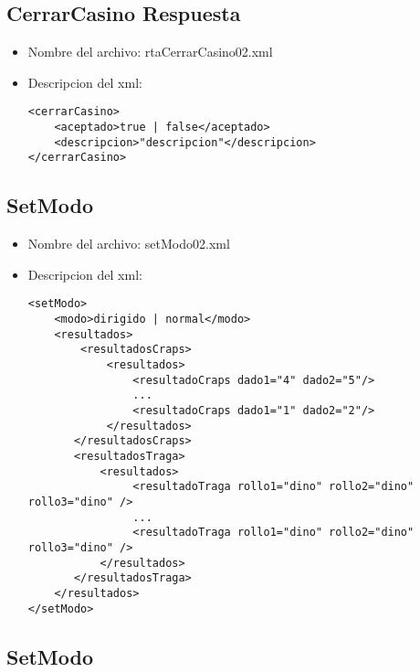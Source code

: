 \subsection{CerrarCasino Respuesta}
\label{sec:CerrarCasinoRespuesta}

\begin{itemize}
	\item Nombre del archivo: rtaCerrarCasino02.xml
	\item Descripcion del xml:
		\begin{verbatim}
<cerrarCasino>
    <aceptado>true | false</aceptado>			
    <descripcion>"descripcion"</descripcion>
</cerrarCasino>
		\end{verbatim}
\end{itemize}

\subsection{SetModo}
\label{sec:SetModo}

\begin{itemize}
	\item Nombre del archivo: setModo02.xml
	\item Descripcion del xml:
		\begin{verbatim}
<setModo>
    <modo>dirigido | normal</modo>
    <resultados>
        <resultadosCraps>
            <resultados>
                <resultadoCraps dado1="4" dado2="5"/>
                ...
                <resultadoCraps dado1="1" dado2="2"/>
            </resultados>
       </resultadosCraps>
       <resultadosTraga>
           <resultados>
                <resultadoTraga rollo1="dino" rollo2="dino" rollo3="dino" />
                ...
                <resultadoTraga rollo1="dino" rollo2="dino" rollo3="dino" />
           </resultados>
       </resultadosTraga>
    </resultados>
</setModo>
\end{verbatim}
\end{itemize}


\subsection{SetModo}
\label{sec:SetModo}

